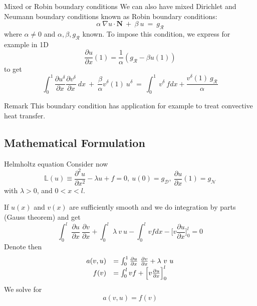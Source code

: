 \begin{frame}{Mixed or Robin boundary conditions}
  We can also have mixed Dirichlet and Neumann boundary conditions known as Robin boundary conditions:
  \begin{equation}
    \label{eq:17}
    \alpha\ \nabla u \cdot \mathbf{N }\ +\ \beta\ u\ =\ g_{\mathcal{R}}
  \end{equation}
  where $\alpha \neq 0$ and $\alpha, \beta, g_{\mathcal{R}}$ known.
  To impose this condition, we express for example in 1D
  \begin{equation}
    \label{eq:18}
    \frac{\partial u}{\partial x}(1) = \frac{1}{\alpha}( g_{\mathcal{R}} - \beta u(1) )
  \end{equation}
  to get
  \begin{equation}
    \label{eq:19}
    \int_0^1 \frac{\partial u^{\delta}}{\partial x}\frac{\partial v^{\delta}}{\partial x}\ dx\ +\ \frac{\beta}{\alpha} v^{\delta}(1)\ u^{\delta}\ =\  \int_0^1\ v^{\delta}\ f dx + \frac{v^{\delta}(1)\ g_{\mathcal{R}}}{\alpha}
  \end{equation}

  \begin{block}{Remark}
    This boundary condition has application for example to treat
    convective heat transfer.
  \end{block}
\end{frame}

\subsection{Mathematical Formulation}
\label{sec:math-form}

\begin{frame}{Helmholtz equation}
  Consider now
  \begin{equation}
    \label{eq:15}
    \mathbb{L}(u) \equiv \frac{\partial^2 u}{\partial x^2} - \lambda u + f = 0,\ u(0) = g_{\mathcal{D}},\ \frac{\partial u}{\partial x}(1) = g_{\mathcal{N}}
  \end{equation}
  with $\lambda > 0$, and $0 < x < l$.

  If $u(x)$ and $v(x)$ are sufficiently smooth and we do integration by parts (Gauss theorem) and get
  \begin{equation}
    \label{eq:20}
    \int_0^l\ \frac{\partial u}{\partial x}\ \frac{\partial v}{\partial x} + \int_0^l\ \lambda\ v\ u - \int_0^l v f dx - \Big[ v\frac{\partial u}{\partial x}\Big]_0^l = 0
  \end{equation}
  Denote then
  \begin{equation}
    \label{eq:21}
    \begin{array}[c]{rl}
      a(v, u) &= \int_0^1 \frac{\partial u}{\partial x}\ \frac{\partial v}{\partial x} + \lambda\ v\ u\\
      f(v) &= \int_0^l vf + \Big[ v\frac{\partial u}{\partial x}\Big]_0^l
    \end{array}
  \end{equation}
  We solve for
  \begin{equation}
    \label{eq:22}
    a(v,u) = f(v)
  \end{equation}
\end{frame}

